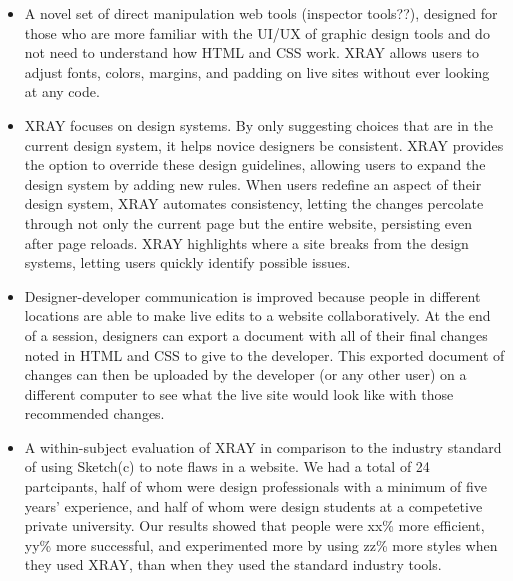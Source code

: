 \documentclass{sigchi}
\newcommand{\xray}{XRAY\xspace}
\begin{document}
\begin{itemize}
    \item A novel set of direct manipulation web tools (inspector tools??), designed for those who are more familiar with the UI/UX of graphic design tools and do not need to understand how HTML and CSS work. \xray allows users to adjust fonts, colors, margins, and padding on live sites without ever looking at any code. 
    
    \item \xray focuses on design systems. By only suggesting choices that are in the current design system, it helps novice designers be consistent. \xray provides the option to override these design guidelines, allowing users to expand the design system by adding new rules. When users redefine an aspect of their design system, \xray automates consistency, letting the changes percolate through not only the current page but the entire website, persisting even after page reloads. \xray highlights where a site breaks from the design systems, letting users quickly identify possible issues. 
    
    \item Designer-developer communication is improved because people in different locations are able to make live edits to a website collaboratively. At the end of a session, designers can export a document with all of their final changes noted in HTML and CSS to give to the developer. This exported document of changes can then be uploaded by the developer (or any other user) on a different computer to see what the live site would look like with those recommended changes. 
    
    \item A within-subject evaluation of \xray in comparison to the industry standard of using Sketch(c) to note flaws in a website. We had a total of 24 partcipants, half of whom were design professionals with a minimum of five years' experience, and half of whom were design students at a competetive private university. Our results showed that people were xx\% more efficient, yy\% more successful, and experimented more by using zz\% more styles when they used \xray, than when they used the standard industry tools.
\end{itemize}
\end{document}
